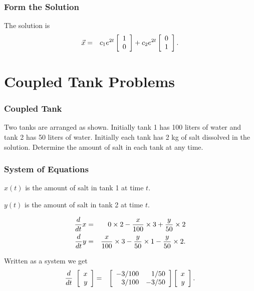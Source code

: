 \begin{frame}
  \frametitle{Form the Solution}
    
  The solution is 
  \begin{eqnarray*}
    \vec{x} & = & c_1 e^{2t} \vecTwo{1}{0} + c_2 e^{2t} \vecTwo{0}{1}.
  \end{eqnarray*}

\end{frame}


\section{Coupled Tank Problems}


\begin{frame}
  \frametitle{Coupled Tank}

  Two tanks are arranged as shown. Initially tank 1 has 100 liters of
  water and tank 2 has 50 liters of water. Initially each tank has 2
  kg of salt dissolved in the solution. Determine the amount of salt
  in each tank at any time.
  
\end{frame}


\begin{frame}
  \frametitle{System of Equations}

  $x(t)$ is the amount of salt in tank 1 at time $t$.

  $y(t)$ is the amount of salt in tank 2 at time $t$.

  \begin{eqnarray*}
    \deriv{x}{t} & = & 0\times 2 - 
    \frac{x}{100}\times 3 + \frac{y}{50}\times 2 \\
    \deriv{y}{t} & = & \frac{x}{100} \times 3 -
    \frac{y}{50} \times 1 - \frac{y}{50}\times 2.
  \end{eqnarray*}

  Written as a system we get
  \begin{eqnarray*}
    \deriv{~}{t} \vecTwo{x}{y} & = & 
    \arrayTwo{-3/100}{1/50}{3/100}{-3/50} \vecTwo{x}{y}.
  \end{eqnarray*}
  
\end{frame}


